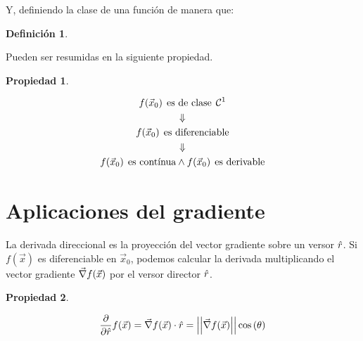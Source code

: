 \documentclass[a5paper,12pt,twoside]{book}
\newtheorem{defn}{{Definición}}[chapter]
\newtheorem{prop}{{Propiedad}}[chapter]
\begin{document}
Y, definiendo la clase de una función de manera que:
\begin{mdframed}[style=DefinitionFrame]
    \begin{defn}
    \end{defn}
\end{mdframed}

Pueden ser resumidas en la siguiente propiedad.

\begin{mdframed}[style=PropertyFrame]
    \begin{prop}
    \end{prop}
    \begin{gather*}
        f(\Vec{x}_0) \hspace{1ex} \textrm{es de clase} \hspace{1ex} \mathcal{C}^{1}
        \\
        \Downarrow
        \\
        f(\Vec{x}_0) \hspace{1ex} \textrm{es diferenciable}
        \\
        \Downarrow
        \\
        f(\Vec{x}_0) \hspace{1ex} \textrm{es contínua}
        \land
        f(\Vec{x}_0) \hspace{1ex} \textrm{es derivable}
    \end{gather*}
\end{mdframed}


\section{Aplicaciones del gradiente}

La derivada direccional es la proyección del vector gradiente sobre un versor $\hat{r}$.
Si $f(\Vec{x})$ es diferenciable en $\Vec{x}_0$, podemos calcular la derivada multiplicando el vector gradiente $\Vec{\nabla} f(\Vec{x})$ por el versor director $\hat{r}$.

\begin{mdframed}[style=PropertyFrame]
    \begin{prop}
    \end{prop}
    \begin{equation*}
        \frac{\partial}{\partial \hat{r}} f(\Vec{x}) = \Vec{\nabla} f(\Vec{x}) \cdot \hat{r} = {\left|\left| { \Vec{\nabla} f(\Vec{x}) } \right|\right|} \cos{(\theta)}
    \end{equation*}
\end{mdframed}
\end{document}
